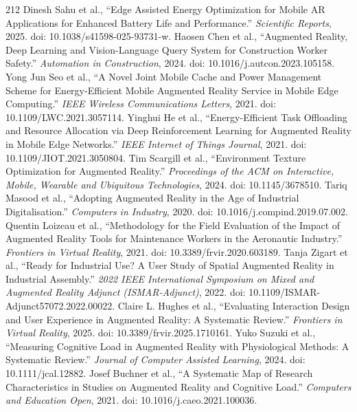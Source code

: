 \begin{thebibliography}{212}
 Dinesh Sahu et al., ``Edge Assisted Energy Optimization for Mobile {AR} Applications for Enhanced Battery Life and Performance.'' \emph{Scientific Reports}, 2025. doi: 10.1038/s41598-025-93731-w.
 Haosen Chen et al., ``Augmented Reality, Deep Learning and Vision-Language Query System for Construction Worker Safety.'' \emph{Automation in Construction}, 2024. doi: 10.1016/j.autcon.2023.105158.
 Yong Jun Seo et al., ``A Novel Joint Mobile Cache and Power Management Scheme for Energy-Efficient Mobile Augmented Reality Service in Mobile Edge Computing.'' \emph{IEEE Wireless Communications Letters}, 2021. doi: 10.1109/LWC.2021.3057114.
 Yinghui He et al., ``Energy-Efficient Task Offloading and Resource Allocation via Deep Reinforcement Learning for Augmented Reality in Mobile Edge Networks.'' \emph{IEEE Internet of Things Journal}, 2021. doi: 10.1109/JIOT.2021.3050804.
 Tim Scargill et al., ``Environment Texture Optimization for Augmented Reality.'' \emph{Proceedings of the ACM on Interactive, Mobile, Wearable and Ubiquitous Technologies}, 2024. doi: 10.1145/3678510.
 Tariq Masood et al., ``Adopting Augmented Reality in the Age of Industrial Digitalisation.'' \emph{Computers in Industry}, 2020. doi: 10.1016/j.compind.2019.07.002.
 Quentin Loizeau et al., ``Methodology for the Field Evaluation of the Impact of Augmented Reality Tools for Maintenance Workers in the Aeronautic Industry.'' \emph{Frontiers in Virtual Reality}, 2021. doi: 10.3389/frvir.2020.603189.
 Tanja Zigart et al., ``Ready for Industrial Use? A User Study of Spatial Augmented Reality in Industrial Assembly.'' \emph{2022 IEEE International Symposium on Mixed and Augmented Reality Adjunct (ISMAR-Adjunct)}, 2022. doi: 10.1109/ISMAR-Adjunct57072.2022.00022.
 Claire L. Hughes et al., ``Evaluating Interaction Design and User Experience in Augmented Reality: A Systematic Review.'' \emph{Frontiers in Virtual Reality}, 2025. doi: 10.3389/frvir.2025.1710161.
 Yuko Suzuki et al., ``Measuring Cognitive Load in Augmented Reality with Physiological Methods: A Systematic Review.'' \emph{Journal of Computer Assisted Learning}, 2024. doi: 10.1111/jcal.12882.
 Josef Buchner et al., ``A Systematic Map of Research Characteristics in Studies on Augmented Reality and Cognitive Load.'' \emph{Computers and Education Open}, 2021. doi: 10.1016/j.caeo.2021.100036.

\end{thebibliography}
